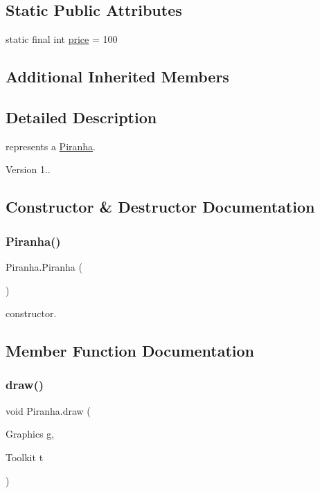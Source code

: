 \subsection*{Static Public Attributes}
\begin{DoxyCompactItemize}
\item 
static final int \mbox{\hyperlink{class_piranha_a4df74b901061840159a8b8e0d5e14f88}{price}} = 100
\end{DoxyCompactItemize}
\subsection*{Additional Inherited Members}


\subsection{Detailed Description}
represents a \mbox{\hyperlink{class_piranha}{Piranha}}. \begin{DoxyVersion}{Version}
1.. 
\end{DoxyVersion}


\subsection{Constructor \& Destructor Documentation}
\mbox{\label{class_piranha_a162bfb763ec65582d2631cb44905b8b0}} 
\subsubsection{\texorpdfstring{Piranha()}{Piranha()}}
{\footnotesize\ttfamily Piranha.\+Piranha (\begin{DoxyParamCaption}{ }\end{DoxyParamCaption})\hspace{0.3cm}{\ttfamily [inline]}}

constructor. 

\subsection{Member Function Documentation}
\mbox{\label{class_piranha_a8a06429a9c5b42fb4246f48c54d6cf78}} 
\subsubsection{\texorpdfstring{draw()}{draw()}}
{\footnotesize\ttfamily void Piranha.\+draw (\begin{DoxyParamCaption}\item[{Graphics}]{g,  }\item[{Toolkit}]{t }\end{DoxyParamCaption})\hspace{0.3cm}{\ttfamily [inline]}}


